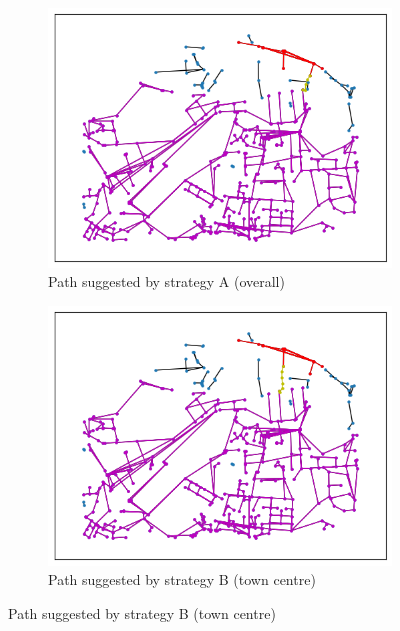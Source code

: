 \documentclass[12pt,a4paper]{report}
\begin{document}
\begin{figure}[ht]
    \centering
    \begin{subfigure}[ht]{0.6\textwidth}
        \centering
        \includegraphics[width=\textwidth,trim={1cm 1cm 1cm 1cm},clip]{diss_images/eval/overall_st_andrews.png}
        \caption{Path suggested by strategy A (overall)}
        \label{fig:overall st andrews}
    \end{subfigure}
    \hfill
    \begin{subfigure}[ht]{0.6\textwidth}
        \centering
        \includegraphics[width=\textwidth,trim={1cm 1cm 1cm 1cm},clip]{diss_images/eval/centre_st_andrews.png}
        \caption{Path suggested by strategy B (town centre)}
        \label{fig:centre st andrews}

\end{subfigure}
\end{figure}
\end{document}
